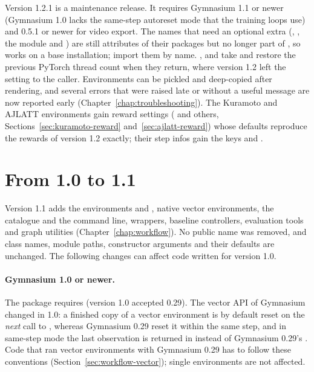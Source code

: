 Version 1.2.1 is a maintenance release. It requires Gymnasium 1.1 or newer
(Gymnasium 1.0 lacks the same-step autoreset mode that the training loops
use) and  0.5.1 or newer for video export. The names that
need an optional extra (,
, the module  and
) are still attributes of their packages but no
longer part of , so  works on a
base installation; import them by name. , 
and  take  and restore the previous PyTorch
thread count when they return, where version 1.2 left the setting to the
caller. Environments can be pickled and deep-copied after rendering, and
several errors that were raised late or without a useful message are now
reported early (Chapter~\ref{chap:troubleshooting}). The Kuramoto and AJLATT
environments gain reward settings ( and others,
Sections~\ref{sec:kuramoto-reward} and~\ref{sec:ajlatt-reward}) whose
defaults reproduce the rewards of version 1.2 exactly; their step infos gain
the keys  and .

\section{From 1.0 to 1.1}\label{sec:migration-11}

Version 1.1 adds the environments  and ,
native vector environments, the catalogue and the  command line,
wrappers, baseline controllers, evaluation tools and graph utilities
(Chapter~\ref{chap:workflow}). No public name was removed, and class names,
module paths, constructor arguments and their defaults are unchanged. The
following changes can affect code written for version 1.0.

\paragraph{Gymnasium 1.0 or newer.} The package requires
 (version 1.0 accepted 0.29). The vector API of
Gymnasium changed in 1.0: a finished copy of a vector environment is by
default reset on the \emph{next} call to , whereas Gymnasium 0.29
reset it within the same step, and in same-step mode the last observation is
returned in  instead of Gymnasium 0.29's
. Code that ran vector
environments with Gymnasium 0.29 has to follow these conventions
(Section~\ref{sec:workflow-vector}); single environments are not affected.

